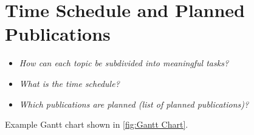 \section{Time Schedule and Planned Publications}
\label{sec:Time Schedule and Planned Publications}

\begin{itemize}
   \item \emph{How can each topic be subdivided into meaningful tasks?}
	\item \emph{What is the time schedule?}
	\item \emph{Which publications are planned (list of planned publications)?}
\end{itemize}

Example Gantt chart shown in \cref{fig:Gantt Chart}.

